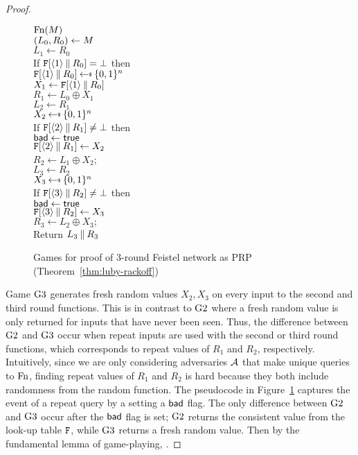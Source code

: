 \begin{proof}
\begin{figure}[t]
{\underline{$\textnormal{Fn}(M)$}\\
$(L_0, R_0) \gets M$\\
$L_1 \gets R_0$\\
If $\mathtt{F}[\langle1\rangle\: \| \: R_0] = \bot$ then\\
\ind $\TabF[\langle1\rangle\concat R_0] \getsr \bits^n$\\
$X_1 \gets \mathtt{F}[\langle1\rangle\: \| \: R_0]$\\
$R_1 \gets L_0 \oplus X_1$\\
$L_2 \gets R_1$\\
$X_2 \getsr \bits^n$\\
If $\mathtt{F}[\langle2\rangle\: \| \: R_1] \ne \bot$ then\\
\ind $\mathsf{bad}\gets\mathsf{true}$\\
$\mathtt{F}[\langle2\rangle\: \| \: R_1] \gets X_2$\\
$R_2 \gets L_1 \oplus X_2$;\;\;\\
$L_3 \gets R_2$\\
$X_3 \getsr \bits^n$\\
If $\mathtt{F}[\langle3\rangle\: \| \: R_2] \ne \bot$ then\\
\ind $\mathsf{bad}\gets\mathsf{true}$\\
$\mathtt{F}[\langle3\rangle\: \| \: R_2] \gets X_3$\\
$R_3 \gets L_2 \oplus X_3;$\;\;\\
Return $L_3 \: \| \: R_3$
}
\caption{Games for proof of 3-round Feistel network as PRP (Theorem~\ref{thm:luby-rackoff})}
\label{fig:games-luby-rackoff}
\end{figure}

Game ${{\textnormal G}}3$ generates fresh random values $X_2, X_3$ on every input to the second and third round functions.
This is in contrast to ${{\textnormal G}}2$ where a fresh random value is only returned for inputs that have never been seen.
Thus, the difference between ${{\textnormal G}}2$ and ${{\textnormal G}}3$ occur when repeat inputs are used with the second or third round functions, which corresponds to repeat values of $R_1$ and $R_2$, respectively.
Intuitively, since we are only considering adversaries ${\mathcal A}$ that make unique queries to $\textnormal{Fn}$, finding repeat values of $R_1$ and $R_2$ is hard because they both include randomness from the random function.
The pseudocode in Figure~\ref{fig:games-luby-rackoff} captures the event of a repeat query by a setting a $\mathsf{bad}$ flag.
The only difference between ${{\textnormal G}}2$ and ${{\textnormal G}}3$ occur after the $\mathsf{bad}$ flag is set; ${{\textnormal G}}2$ returns the consistent value from the look-up table $\mathtt{F}$, while ${{\textnormal G}}3$ returns a fresh random value.
Then by the fundamental lemma of game-playing,
\bnm
{} \le {}.
\enm


\end{proof}
